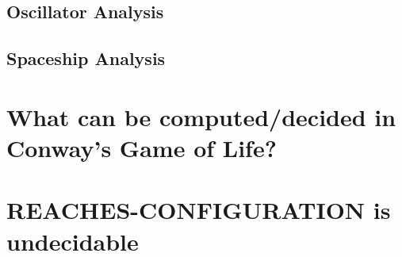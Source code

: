 \documentclass{article}
\theoremstyle{definition}
\theoremstyle{plain}
\theoremstyle{plain}
\begin{document}
\subsection{Oscillator Analysis}

\subsection{Spaceship Analysis}

\section{What can be computed/decided in Conway’s Game of Life?}

\section{REACHES-CONFIGURATION is undecidable}

\printbibliography
\end{document}
